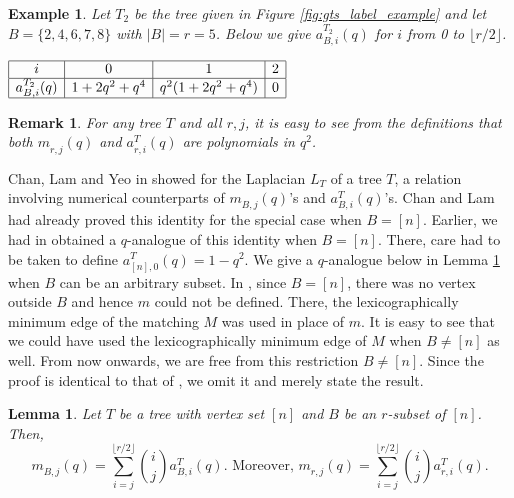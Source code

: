 \documentclass[12pt]{article}
\newtheorem{lemma}[theorem]{Lemma}
\newtheorem{example}[theorem]{Example}
\newtheorem{remark}[theorem]{Remark}
\newcommand{\rhalf}{\lfloor r/2 \rfloor}
\begin{document}
\begin{example}
  Let $T_2$ be the tree given in Figure 
\ref{fig:gts_label_example}
  and let $B = \{2,4,6,7,8\}$
  with $|B| = r = 5$.  Below we give $a_{B,i}^{T_2}(q)$ for $i$ from 0 to $\rhalf$.


\begin{center}
	 $\begin{array}{|c|c|c|c|}  \hline
	i & 0 & 1 & 2   \\ \hline
	a_{B,i}^{T_2}(q) & 1+2q^2+q^4 & q^2(1+2q^2+q^4) & 0 \\ \hline
  \end{array}$
\end{center}
\end{example}

\begin{remark}
  \label{rem:poly_q_sq}
For any tree $T$ and all $r,j$, it is easy to see from the definitions
that both $m_{r,j}^{}(q)$ and $a_{r,i}^T(q)$ are polynomials in $q^2$. 
\end{remark}

Chan, Lam and Yeo in \cite{chan_lam_yeo} showed for the Laplacian 
$L_T$ of a tree $T$, a relation involving numerical counterparts of $m_{B,j}^{}(q)$'s
and $a_{B,i}^T(q)$'s.  Chan and Lam \cite{hook_immanant_explained-chan_lam}
had already proved this identity 
for the special case when $B = [n]$.  Earlier, we had in 
\cite[Theorem 11]{mukesh-siva-hook}  
obtained a $q$-analogue of this identity when $B = [n]$.
There, care had to be taken to define 
$a_{[n],0}^T(q) = 1-q^2$.  We give a $q$-analogue  below in Lemma 
\ref{lem:reln_aiq_mjq} when $B$ can be an arbitrary subset.  
In \cite{mukesh-siva-hook}, since $B = [n]$, there was no
vertex outside $B$ and hence $m$ could not be defined.  There, the lexicographically
minimum edge of the matching $M$ was used in place of $m$.  It is easy to
see that we could have used the lexicographically minimum edge of $M$ 
when $B \neq [n]$ as well.  
From now onwards, we are free from this restriction $B \not= [n]$.
Since the proof is identical to that of 
\cite[Theorem 11]{mukesh-siva-hook}, we omit it and merely
state the result.


\begin{lemma}
  \label{lem:reln_aiq_mjq}
Let $T$ be a tree with vertex set $[n]$ and $B$ be an $r$-subset of $[n]$. Then,  
$$m_{B,j}^{}(q)=\sum\limits_{i=j}^{\rhalf} {i \choose j} a_{B,i}^T(q).  \mbox{  Moreover, }
m_{r,j}^{}(q)=\sum\limits_{i=j}^{\rhalf} {i \choose j} a_{r,i}^T(q).$$
\end{lemma}
\end{document}
